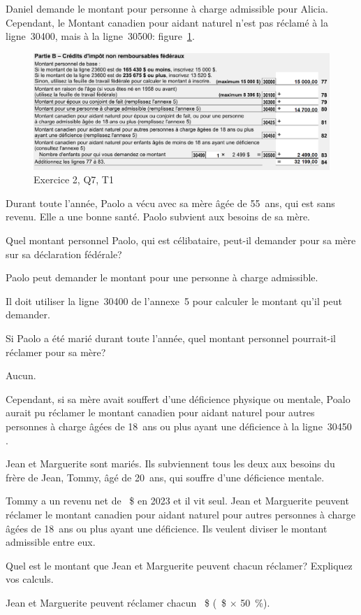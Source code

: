 Daniel demande le montant pour personne à charge admissible pour Alicia. Cependant, le Montant canadien pour aidant naturel n'est pas réclamé à la ligne~30400, mais à la ligne~30500: figure~\ref{fig:chap4Exercice2Q7T1}.
\begin{figure}
	\centering
	\includegraphics[width=.9\textwidth]{exercice/4-2/Q7/T1.png}
	\caption[]{Exercice 2, Q7, T1}
	\label{fig:chap4Exercice2Q7T1}
\end{figure}

\begin{question}
	Durant toute l'année, Paolo a vécu avec sa mère âgée de 55~ans, qui est sans revenu. Elle a une bonne santé. Paolo subvient aux besoins de sa mère.
\end{question}
\setcounter{sousQuestion}{0}
\begin{sousQuestion}
	Quel montant personnel Paolo, qui est célibataire, peut-il demander pour sa mère sur sa déclaration fédérale?
\end{sousQuestion}
Paolo peut demander le montant pour une personne à charge admissible.

Il doit utiliser la ligne~30400 de l'annexe~5 pour calculer le montant qu'il peut demander.

\begin{sousQuestion}
	Si Paolo a été marié durant toute l'année, quel montant personnel pourrait-il réclamer pour sa mère?
\end{sousQuestion}
Aucun.

Cependant, si sa mère avait souffert d'une déficience physique ou mentale, Poalo aurait pu réclamer le montant canadien pour aidant naturel pour autres personnes à charge âgées de 18~ans ou plus ayant une déficience à la ligne~30450 .

\begin{question}
	Jean et Marguerite sont mariés. Ils subviennent tous les deux aux besoins du frère de Jean, Tommy, âgé de 20~ans, qui souffre d'une déficience mentale. 
	
	Tommy a un revenu net de ~\$ en 2023 et il vit seul. Jean et Marguerite peuvent réclamer le montant canadien pour aidant naturel pour autres personnes à charge âgées de 18~ans ou plus ayant une déficience. Ils veulent diviser le montant admissible entre eux. 
	
	Quel est le montant que Jean et Marguerite peuvent chacun réclamer? Expliquez vos calculs.
\end{question}
Jean et Marguerite peuvent réclamer chacun ~\$ (~\$ $\times$ 50~\%).

